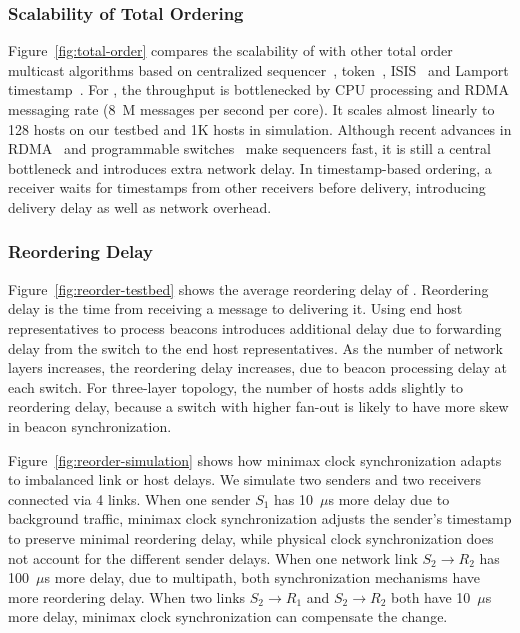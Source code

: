 \subsubsection{Scalability of Total Ordering}

Figure~\ref{fig:total-order} compares the scalability of \sys with other total order multicast algorithms based on centralized sequencer~\cite{eris,kaminsky2016design}, token~\cite{rajagopalan1989token}, ISIS~\cite{birman1985replication} and Lamport timestamp~\cite{lamport1978time}.
For \sys, the throughput is bottlenecked by CPU processing and RDMA messaging rate (8~M messages per second per core).
It scales almost linearly to 128 hosts on our testbed and 1K hosts in simulation.
Although recent advances in RDMA~\cite{kaminsky2016design} and programmable switches~\cite{eris} make sequencers fast, it is still a central bottleneck and introduces extra network delay.
In timestamp-based ordering, a receiver waits for timestamps from  other receivers before delivery, introducing delivery delay as well as network overhead.




\subsubsection{Reordering Delay}
\label{sec:eval-delay}

Figure~\ref{fig:reorder-testbed} shows the average reordering delay of \sys.
Reordering delay is the time from receiving a message to delivering it.
Using end host representatives to process beacons introduces additional delay due to forwarding delay from the switch to the end host representatives.
As the number of network layers increases, the reordering delay increases, due to beacon processing delay at each switch.
For three-layer topology, the number of hosts adds slightly to reordering delay, because a switch with higher fan-out is likely to have more skew in beacon synchronization.

Figure~\ref{fig:reorder-simulation} shows how minimax clock synchronization adapts to imbalanced link or host delays.
We simulate two senders and two receivers connected via 4 links.
When one sender $S_1$ has 10~$\mu$s more delay due to background traffic, minimax clock synchronization adjusts the sender's timestamp to preserve minimal reordering delay, while physical clock synchronization does not account for the different sender delays.
When one network link $S_2 \rightarrow R_2$ has 100~$\mu$s more delay, due to multipath, both synchronization mechanisms have more reordering delay.
When two links $S_2 \rightarrow R_1$ and $S_2 \rightarrow R_2$ both have 10~$\mu$s more delay, minimax clock synchronization can compensate the change.



